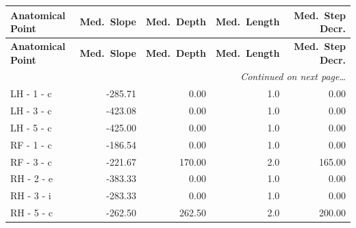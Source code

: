 \documentclass[a4paper,11pt]{article}
\begin{document}
\begin{small}
\begin{longtable}{p{4.5cm}rrrr}
\toprule
\textbf{Anatomical Point} &
\textbf{Med.\ Slope} &
\textbf{Med.\ Depth} &
\textbf{Med.\ Length} &
\textbf{Med.\ Step Decr.} \\
\midrule
\endfirsthead
\toprule
\textbf{Anatomical Point} &
\textbf{Med.\ Slope} &
\textbf{Med.\ Depth} &
\textbf{Med.\ Length} &
\textbf{Med.\ Step Decr.} \\
\midrule
\endhead
\midrule
\multicolumn{5}{r}{\small\emph{Continued on next page\ldots}} \\
\endfoot
\bottomrule
\endlastfoot
LH - 1 - c & -285.71 & 0.00 & 1.0 & 0.00 \\
LH - 3 - c & -423.08 & 0.00 & 1.0 & 0.00 \\
LH - 5 - c & -425.00 & 0.00 & 1.0 & 0.00 \\
RF - 1 - c & -186.54 & 0.00 & 1.0 & 0.00 \\
RF - 3 - c & -221.67 & 170.00 & 2.0 & 165.00 \\
RH - 2 - e & -383.33 & 0.00 & 1.0 & 0.00 \\
RH - 3 - i & -283.33 & 0.00 & 1.0 & 0.00 \\
RH - 5 - c & -262.50 & 262.50 & 2.0 & 200.00 \\
\end{longtable}
\end{small}
\end{document}

